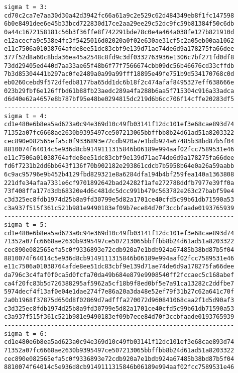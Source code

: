\documentclass{article}
\begin{document}
{\begin{verbatim}
sigma t = 3:
cd70c2ca7e7aa30d30a42d3942fc66a61a9c2e529c62d484349eb8f1fc147598
6b0e8491dee6e45b33bcd722830d17ce2aa29ee29c52dc9fc59b81384f50c6db
0a44c1672158181c56b3f36ffe8f742291bde78c0e4a464a038fe127b821910d
e12acecfa9c538e4fc3f5425016d02020a0f02e630ae31cf5c2a05eb00aa1062
e11c7506a01038764afde8ee51dc83cbf9e139d71ae74de6d9a178275fa66dee
377f52d8a60c8bda36ea45a2548c8fd9c3df0332763936e1306c7bf271fd0df8
73dd29405ed440d7aa33ae65f48b6f77f7566674cbb09dc56b46676cd33cffdb
7b3d85304441b297ac0fe2489a0a99a99fff18895e49fe751b9d534170768c0d
eb0260cebd9f572dfedb8177ba65dd1dc6b18f2c474afaf8495327eff638666e
023b29fbf6e126ffbd61b88fb23aedc289a4fa288b6aa5f715304c916a33adca
d6d40e62a4657e8b787bf95e48be0294815dc219d6b6cc706f14cffe20283df5
----------------------------------------------------------------
sigma t = 4:
cd1e480e6b8ea5ad623a0c94e369d10c49fb03141f12dc101ef3e68cae893d74
71352a07fc6668ae2630b9395497ce507213065bbffbb8b24d61ad51a8203322
cec890e082565efa5c0f9336893e72cdb920a7e1bdb924a67485b38bd87b5f04
8810074f64014c5e936d8cb9149111315846b06189e994aaf02fcc7589531e46
e11c7506a01038764afde8ee51dc83cbf9e139d71ae74de6d9a178275fa66dee
fd6f7231b2dd6bb643f136f70b902182e293861cdcb7b5958b64e0a26a59aabb
6c9ac95796e9b452b4129fbd829321e8a6284dfa194b4bf259fea140a1363808
221dfe34afaa7331e6cf9701892642bad24282f1afe272788ddfb7977e39ff0a
73f408ffa177d3db68320e4d6c481dc5dcc991b479c563782e263c27babf59e4
c3d325ec8fdb1974d25b8a9fd30799e5d82a1701ce40cfd5c99b61db71590a53
c3a937f515f361c521b981e9490183ef09b7ece84d70f3ccbfaade0193765939
----------------------------------------------------------------
sigma t = 5:
cd1e480e6b8ea5ad623a0c94e369d10c49fb03141f12dc101ef3e68cae893d74
71352a07fc6668ae2630b9395497ce507213065bbffbb8b24d61ad51a8203322
cec890e082565efa5c0f9336893e72cdb920a7e1bdb924a67485b38bd87b5f04
8810074f64014c5e936d8cb9149111315846b06189e994aaf02fcc7589531e46
e11c7506a01038764afde8ee51dc83cbf9e139d71ae74de6d9a178275fa66dee
da796c3c4faf0f0ca5d0fcfa70da49b684e879e9908540ff2fccaec5c168abef
ca4f20fc83b5d726388295af5962a5cf18b9f8ed0bf5e7a91ca13282c2ddfbe7
5974decf4f13af0e04e1dae274f7e86a20a3da48e52ef79f31b27c62a641c70f
2a0b1968f37875d650d8f02869d7adfffa270072d960841068caa2f1d5d90af3
c3d325ec8fdb1974d25b8a9fd30799e5d82a1701ce40cfd5c99b61db71590a53
c3a937f515f361c521b981e9490183ef09b7ece84d70f3ccbfaade0193765939
----------------------------------------------------------------
sigma t = 6:
cd1e480e6b8ea5ad623a0c94e369d10c49fb03141f12dc101ef3e68cae893d74
71352a07fc6668ae2630b9395497ce507213065bbffbb8b24d61ad51a8203322
cec890e082565efa5c0f9336893e72cdb920a7e1bdb924a67485b38bd87b5f04
8810074f64014c5e936d8cb9149111315846b06189e994aaf02fcc7589531e46

\end{verbatim}}
\end{document}
